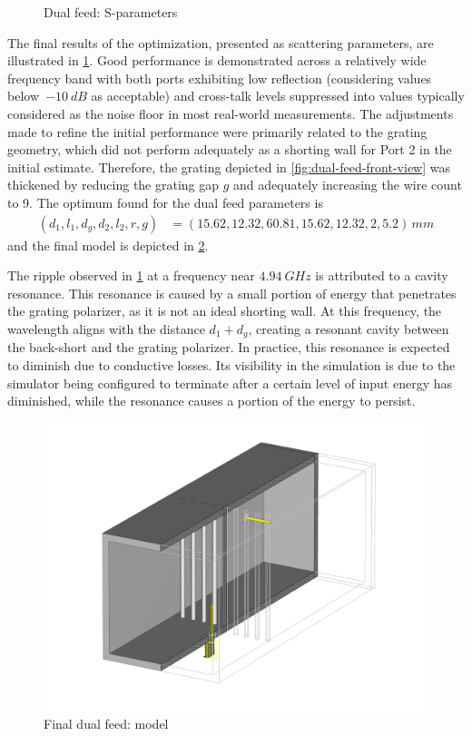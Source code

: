 \documentclass[11pt,a4paper,twoside,openany]{report}
\begin{document}
\begin{figure}[!ht]
    \centering
    
    \caption{\label{fig:dual-feed-sparameters}Dual feed: S-parameters}
\end{figure}

The final results of the optimization, presented as scattering parameters, are illustrated in \cref{fig:dual-feed-sparameters}. Good performance is demonstrated across a relatively wide frequency band with both ports exhibiting low reflection (considering values below~$-\qty{10}{dB}$ as acceptable) and cross-talk levels suppressed into values typically considered as the noise floor in most real-world measurements. The adjustments made to refine the initial performance were primarily related to the grating geometry, which did not perform adequately as a shorting wall for Port 2 in the initial estimate. Therefore, the grating depicted in \cref{fig:dual-feed-front-view} was thickened by reducing the grating gap $g$ and adequately increasing the wire count to 9. The optimum found for the dual feed parameters is
\begin{align}
    \label{eq:dual-feed-optimum}
    (d_1,l_1,d_g,d_2,l_2,r,g) &= (15.62,12.32,60.81,15.62, 12.32,2,5.2)\,\unit{mm}
\end{align}
and the final model is depicted in \cref{fig:dual-feed-perspective}.

\begin{remark}
    The ripple observed in \cref{fig:dual-feed-sparameters} at a frequency near $\qty{4.94}{GHz}$ is attributed to a cavity resonance. This resonance is caused by a small portion of energy that penetrates the grating polarizer, as it is not an ideal shorting wall. At this frequency, the wavelength aligns with the distance $d_1+d_g$, creating a resonant cavity between the back-short and the grating polarizer. In practice, this resonance is expected to diminish due to conductive losses. Its visibility in the simulation is due to the simulator being configured to terminate after a certain level of input energy has diminished, while the resonance causes a portion of the energy to persist.
\end{remark}

\begin{figure}[!ht]
    \centering
    \includegraphics[width=.8\textwidth]{src/dual_feed_perspective.png}
    \caption{\label{fig:dual-feed-perspective}Final dual feed: model}
\end{figure}
\end{document}
